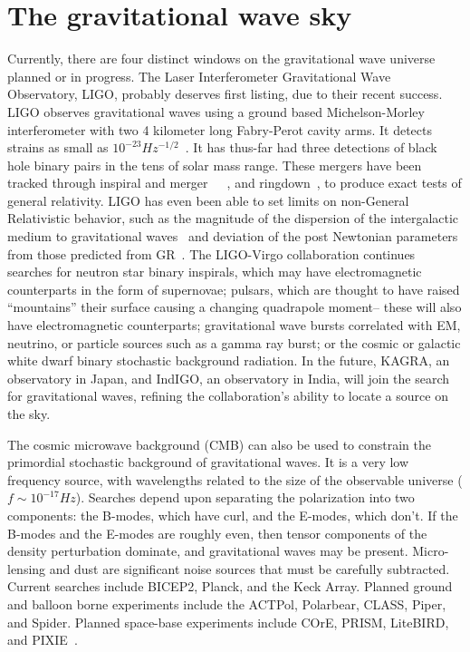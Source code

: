 \section{The gravitational wave sky}
Currently, there are four distinct windows on the gravitational wave universe planned or in progress. The Laser Interferometer Gravitational Wave Observatory, LIGO, probably deserves first listing, due to their recent success. LIGO observes gravitational waves using a ground based Michelson-Morley interferometer with two 4 kilometer long Fabry-Perot cavity arms. It detects strains as small as $10^{-23} Hz^{-1/2}$~\cite{LIGOsensitivity}. It has thus-far had three detections of black hole binary pairs in the tens of solar mass range. These mergers have been tracked through inspiral and merger~\cite{GW150914}~\cite{GW151226}~\cite{GW170104}, and ringdown~\cite{LIGO1e}, to produce exact tests of general relativity. LIGO has even been able to set limits on non-General Relativistic behavior, such as the magnitude of the dispersion of the intergalactic medium to gravitational waves~\cite{GW170104} and deviation of the post Newtonian parameters from those predicted from GR~\cite{LIGO1e}. The LIGO-Virgo collaboration continues searches for neutron star binary inspirals, which may have electromagnetic counterparts in the form of supernovae; pulsars, which are thought to have raised ``mountains'' their surface causing a changing quadrapole moment-- these will also have electromagnetic counterparts; gravitational wave bursts correlated with EM, neutrino, or particle sources such as a gamma ray burst; or the cosmic or galactic white dwarf binary stochastic background radiation. In the future, KAGRA, an observatory in Japan, and IndIGO, an observatory in India, will join the search for gravitational waves, refining the collaboration's ability to locate a source on the sky. 


The cosmic microwave background (CMB) can also be used to constrain the primordial stochastic background of gravitational waves. It is a very low frequency source, with wavelengths related to the size of the observable universe ($f\sim 10^{-17} Hz$). Searches depend upon separating the polarization into two components: the B-modes, which have curl, and the E-modes, which don't. If the B-modes and the E-modes are roughly even, then tensor components of the density perturbation dominate, and gravitational waves may be present. Micro-lensing and dust are significant noise sources that must be carefully subtracted. Current searches include BICEP2, Planck, and the Keck Array. Planned ground and balloon borne experiments include the ACTPol, Polarbear, CLASS, Piper, and Spider. Planned space-base experiments include COrE, PRISM, LiteBIRD, and PIXIE~\cite{bmodes}. 


